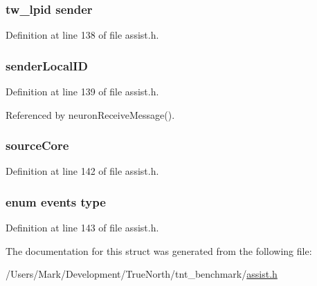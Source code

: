 \hypertarget{struct_msg___data_ac94c7cb1b3f009936733d0f0cec9f72a}{}
\subsubsection[{sender}]{\setlength{\rightskip}{0pt plus 5cm}tw\+\_\+lpid sender}\label{struct_msg___data_ac94c7cb1b3f009936733d0f0cec9f72a}


Definition at line 138 of file assist.\+h.

\hypertarget{struct_msg___data_af4e0329991e30bd3958b93c3bbb3038d}{}
\subsubsection[{sender\+Local\+I\+D}]{ sender\+Local\+I\+D}\label{struct_msg___data_af4e0329991e30bd3958b93c3bbb3038d}


Definition at line 139 of file assist.\+h.



Referenced by neuron\+Receive\+Message().

\hypertarget{struct_msg___data_a13b05c6b2a199a7bdf79a18b9e7c22e9}{}
\subsubsection[{source\+Core}]{ source\+Core}\label{struct_msg___data_a13b05c6b2a199a7bdf79a18b9e7c22e9}


Definition at line 142 of file assist.\+h.

\hypertarget{struct_msg___data_ab8720847cee557678e9bfc7da95d46bf}{}
\subsubsection[{type}]{\setlength{\rightskip}{0pt plus 5cm}enum {\bf events} type}\label{struct_msg___data_ab8720847cee557678e9bfc7da95d46bf}


Definition at line 143 of file assist.\+h.



The documentation for this struct was generated from the following file\+:\begin{DoxyCompactItemize}
\item 
/\+Users/\+Mark/\+Development/\+True\+North/tnt\+\_\+benchmark/\hyperlink{assist_8h}{assist.\+h}\end{DoxyCompactItemize}

